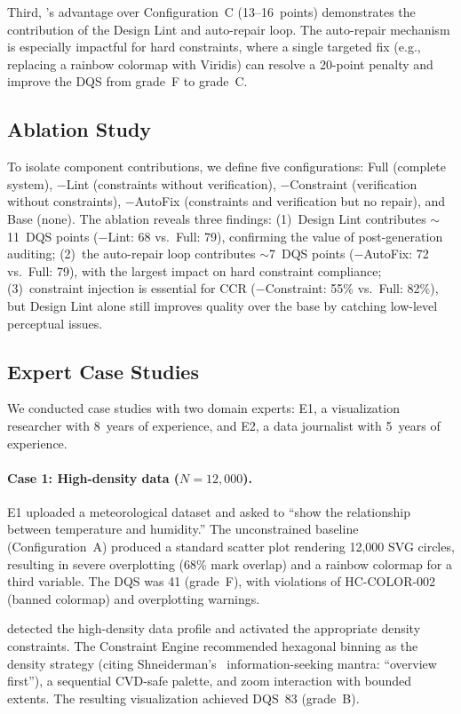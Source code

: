 Third, \sysname{}'s advantage over Configuration~C (13--16~points) demonstrates the contribution of the Design Lint and auto-repair loop. The auto-repair mechanism is especially impactful for hard constraints, where a single targeted fix (e.g., replacing a rainbow colormap with Viridis) can resolve a 20-point penalty and improve the DQS from grade~F to grade~C.

\subsection{Ablation Study}

To isolate component contributions, we define five configurations: Full (complete system), $-$Lint (constraints without verification), $-$Constraint (verification without constraints), $-$AutoFix (constraints and verification but no repair), and Base (none). The ablation reveals three findings:
(1)~Design Lint contributes $\sim$11~DQS points ($-$Lint: 68 vs.\ Full: 79), confirming the value of post-generation auditing;
(2)~the auto-repair loop contributes $\sim$7~DQS points ($-$AutoFix: 72 vs.\ Full: 79), with the largest impact on hard constraint compliance;
(3)~constraint injection is essential for CCR ($-$Constraint: 55\% vs.\ Full: 82\%), but Design Lint alone still improves quality over the base by catching low-level perceptual issues.

\subsection{Expert Case Studies}

We conducted case studies with two domain experts: E1, a visualization researcher with 8~years of experience, and E2, a data journalist with 5~years of experience.

\paragraph{Case 1: High-density data ($N=12{,}000$).}
E1 uploaded a meteorological dataset and asked \sysname{} to ``show the relationship between temperature and humidity.'' The unconstrained baseline (Configuration~A) produced a standard scatter plot rendering 12,000 SVG circles, resulting in severe overplotting (68\% mark overlap) and a rainbow colormap for a third variable. The DQS was 41 (grade~F), with violations of HC-COLOR-002 (banned colormap) and overplotting warnings.

\sysname{} detected the high-density data profile and activated the appropriate density constraints. The Constraint Engine recommended hexagonal binning as the density strategy (citing Shneiderman's~\cite{shneiderman1996eyes} information-seeking mantra: ``overview first''), a sequential CVD-safe palette, and zoom interaction with bounded extents. The resulting visualization achieved DQS~83 (grade~B).

